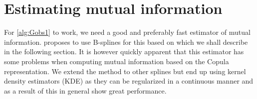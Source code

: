 \documentclass[../Thesis.tex]{subfiles}
\begin{document}
\section{Estimating mutual information}\label{subsec:Mutual information estimation and KDE methods}
For \autoref{alg:Gobs1} to work, we need a good and preferably fast estimator of mutual information. \cite{Network-deconvolution-as-a-general-method-to-distinguish-direct-dependencies-in-networks} proposes to use B-splines for this based on \cite{RePEc:plo:pbio00:0050008} which we shall describe in the following section. It is however quickly apparent that this estimator has some problems when computing mutual information based on the Copula representation. We extend the method to other splines but end up using kernel density estimators (KDE) as they can be regularized in a continuous manner and as a result of this in general show great performance.
\end{document}

